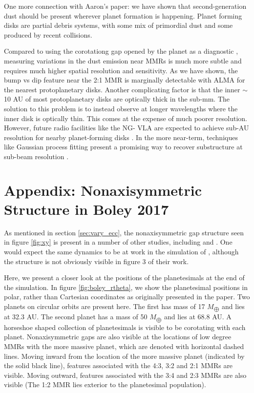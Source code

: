 \documentclass[twocolumn]{aastex63}
\begin{document}
One more connection with Aaron's paper: we have shown that second-generation dust should be present wherever planet formation is happening. 
Planet forming disks are partial debris systems, with some mix of primordial dust and some produced by recent collisions.

Compared to using the corotationg gap opened by the planet as a diagnostic \citep{2013ApJ...777L..31D, 2016ApJ...820...29D}, measuring 
variations in the dust emission near MMRs is much more subtle and requires much higher spatial resolution and sensitivity. As we have shown, the 
bump vs dip feature near the 2:1 MMR is marginally detectable with ALMA for the nearest protoplanetary disks. Another complicating factor is that 
the inner $\sim$ 10 AU of most protoplanetary disks are optically thick in the sub-mm. The solution to this problem is to instead observe at longer 
wavelengths where the inner disk is optically thin. This comes at the expense of much poorer resolution. However, future radio facilities like the NG-
VLA are expected to achieve sub-AU resolution for nearby planet-forming disks \citep{2018ASPC..517..147R}. In the more near-term, techniques 
like Gaussian process fitting present a promising way to recover substructure at sub-beam resolution \citep{2020arXiv200507709J}.



\clearpage

\section{Appendix: Nonaxisymmetric Structure in Boley 2017}\label{sec:boley_plot}

As mentioned in section \ref{sec:vary_ecc}, the nonaxisymmetric gap structure seen in figure \ref{fig:xy} is present in a number of other studies,
including \citet{2000Icar..143...45R} and \citet{2016ApJ...818..159T}. One would expect the same dynamics to be at work in the simulation of 
\citet{2017ApJ...850..103B}, although the structure is not obviously visible in figure 3 of their work.

Here, we present a closer look at the positions of the planetesimals at the end of the \citet{2017ApJ...850..103B} simulation. In figure 
\ref{fig:boley_rtheta}, we show the planetesimal positions in polar, rather than Cartesian coordinates as originally presented in the paper. Two planets 
on circular orbits are present here. The first has mass of 17 $M_{\bigoplus}$ and lies at 32.3 AU. The second planet has a mass of 50 $M_{\bigoplus}$ 
and lies at 68.8 AU. A horseshoe shaped collection of planetesimals is visible to be corotating with each planet. Nonaxisymmetric gaps are also
visible at the locations of low degree MMRs with the more massive planet, which are denoted with horizontal dashed lines. Moving inward from the 
location of the more massive planet (indicated by the solid black line), features associated with the 4:3, 3:2 and 2:1 MMRs are visible. Moving 
outward, features associated with the 3:4 and 2:3 MMRs are also visible (The 1:2 MMR lies exterior to the planetesimal population).
\end{document}
